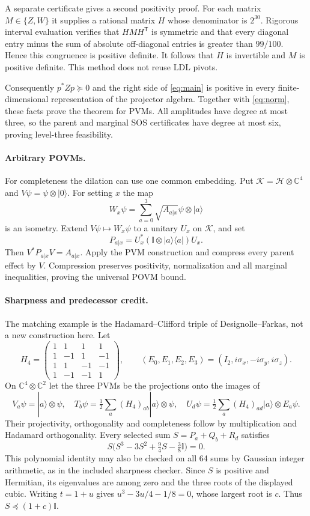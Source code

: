 \documentclass[11pt]{article}
\newcommand{\Id}{\mathbb I}
\begin{document}
A separate certificate gives a second positivity proof. For each matrix $M\in\{Z,W\}$ it supplies a rational matrix $H$ whose denominator is $2^{30}$. Rigorous interval evaluation verifies that $HMH^\mathsf T$ is symmetric and that every diagonal entry minus the sum of absolute off-diagonal entries is greater than $99/100$. Hence this congruence is positive definite. It follows that $H$ is invertible and $M$ is positive definite. This method does not reuse LDL pivots.

Consequently $p^*Zp\succeq0$ and the right side of \eqref{eq:main} is positive in every finite-dimensional representation of the projector algebra. Together with \eqref{eq:norm}, these facts prove the theorem for PVMs. All amplitudes have degree at most three, so the parent and marginal SOS certificates have degree at most six, proving level-three feasibility.

\paragraph{Arbitrary POVMs.}
For completeness the dilation can use one common embedding. Put $\mathcal K=\mathcal H\otimes\mathbb C^4$ and $V\psi=\psi\otimes|0\rangle$. For setting $x$ the map
\[
 W_x\psi=\sum_{a=0}^3\sqrt{A_{a|x}}\psi\otimes|a\rangle
\]
is an isometry. Extend $V\psi\mapsto W_x\psi$ to a unitary $U_x$ on $\mathcal K$, and set
\[
 P_{a|x}=U_x^*(\Id\otimes|a\rangle\langle a|)U_x.
\]
Then $V^*P_{a|x}V=A_{a|x}$. Apply the PVM construction and compress every parent effect by $V$. Compression preserves positivity, normalization and all marginal inequalities, proving the universal POVM bound.

\paragraph{Sharpness and predecessor credit.}
The matching example is the Hadamard--Clifford triple of Designolle--Farkas, not a new construction here. Let
\[
 H_4=\begin{pmatrix}1&1&1&1\\1&-1&1&-1\\1&1&-1&-1\\1&-1&-1&1\end{pmatrix},\qquad
 (E_0,E_1,E_2,E_3)=(I_2,i\sigma_x,-i\sigma_y,i\sigma_z).
\]
On $\mathbb C^4\otimes\mathbb C^2$ let the three PVMs be the projections onto the images of
\[
 V_a\psi=|a\rangle\otimes\psi,\quad
 T_b\psi=\tfrac12\sum_a(H_4)_{ab}|a\rangle\otimes\psi,\quad
 U_d\psi=\tfrac12\sum_a(H_4)_{ad}|a\rangle\otimes E_a\psi.
\]
Their projectivity, orthogonality and completeness follow by multiplication and Hadamard orthogonality. Every selected sum $S=P_a+Q_b+R_d$ satisfies
\[
 S\big(S^3-3S^2+\tfrac94S-\tfrac38\Id\big)=0.
\]
This polynomial identity may also be checked on all 64 sums by Gaussian integer arithmetic, as in the included sharpness checker. Since $S$ is positive and Hermitian, its eigenvalues are among zero and the three roots of the displayed cubic. Writing $t=1+u$ gives $u^3-3u/4-1/8=0$, whose largest root is $c$. Thus $S\preceq(1+c)\Id$.
\end{document}
